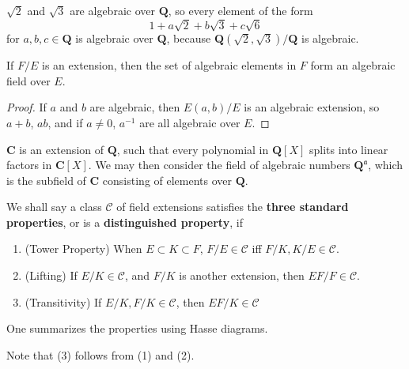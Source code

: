 \begin{example}
    $\sqrt{2}$ and $\sqrt{3}$ are algebraic over $\mathbf{Q}$, so every element of the form
    \[ 1 + a \sqrt{2} + b \sqrt{3} + c \sqrt{6} \]
    for $a,b,c \in \mathbf{Q}$ is algebraic over $\mathbf{Q}$, because $\mathbf{Q}(\sqrt{2},\sqrt{3})/\mathbf{Q}$ is algebraic.
\end{example}

\begin{theorem}
    If $F/E$ is an extension, then the set of algebraic elements in $F$ form an algebraic field over $E$.
\end{theorem}
\begin{proof}
    If $a$ and $b$ are algebraic, then $E(a,b)/E$ is an algebraic extension, so $a + b$, $ab$, and if $a \neq 0$, $a^{-1}$ are all algebraic over $E$.
\end{proof}

\begin{example}
    $\mathbf{C}$ is an extension of $\mathbf{Q}$, such that every polynomial in $\mathbf{Q}[X]$ splits into linear factors in $\mathbf{C}[X]$. We may then consider the field of algebraic numbers $\mathbf{Q}^{\mathfrak{a}}$, which is the subfield of $\mathbf{C}$ consisting of elements over $\mathbf{Q}$.
\end{example}

We shall say a class $\mathcal{C}$ of field extensions satisfies the {\bf three standard properties}, or is a {\bf distinguished property}, if
%
\begin{enumerate}
    \item (Tower Property) When $E \subset K \subset F$, $F/E \in \mathcal{C}$ iff $F/K,K/E \in \mathcal{C}$.
    \item (Lifting) If $E/K \in \mathcal{C}$, and $F/K$ is another extension, then $EF/F \in \mathcal{C}$.
    \item (Transitivity) If $E/K, F/K \in \mathcal{C}$, then $EF/K \in \mathcal{C}$
\end{enumerate}
%
One summarizes the properties using Hasse diagrams.
%
\begin{center}
\end{center}
%
Note that (3) follows from (1) and (2).

